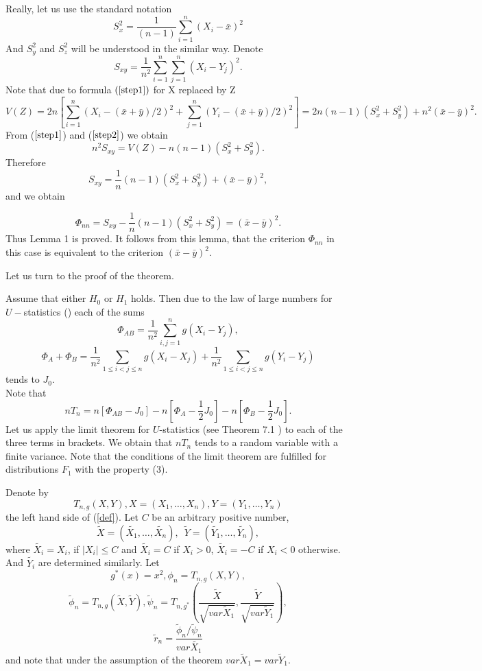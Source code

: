 \documentclass[final,11pt,3p]{elsarticle}
\begin{document}
Really, let us use the standard notation
$$
S_x^2=\frac {1}{(n-1)} \sum_{i=1}^n (X_i - \bar x)^2
$$
And  $S_y^2$ and $S_z^2$ will be understood in the similar way.
Denote 
$$
S_{xy}=\frac{1}{n^2}\sum_{i=1}^n\sum_{j=1}^n (X_i-Y_j)^2.
$$
Note that due to formula $(\ref{step1})$ for X replaced by Z
\begin{equation}\label{step3a}
V(Z)=2n[\sum_{i=1}^n(X_i- (\bar x + \bar y)/2)^2 +\sum_{j=1}^n(Y_i- (\bar x + \bar y)/2)^2] = 2n(n-1) (S_x^2 + S_y^2) +n^2(\bar x- \bar y)^2.
\end{equation}
From ($\ref{step1}$) and  ($\ref{step2}$) we obtain
\begin{equation}\label{step3}
n^2S_{xy}=V(Z)-n(n-1)(S_x^2+S_y^2).
\end{equation}
Therefore
$$
S_{xy} =\frac{1}{n}(n-1)(S_x^2+S_y^2)+ (\bar x-\bar y)^2,
$$
and we obtain

$$
\Phi_{nn}= S_{xy} - \frac{1}{n}(n-1)(S_x^2+S_y^2)=(\bar x - \bar y)^2.  
$$
Thus Lemma 1 is proved.
It follows from this lemma, that the criterion $\Phi_{nn}$ in this case is equivalent to the criterion $(\bar x - \bar y)^2.$

Let us turn to the proof of the theorem.

Assume that either $H_0$ or $H_1$ holds. Then due to the law of large numbers for $U-$statistics (\cite{Hoeffding}) each of the sums 
$$
\Phi_{AB}=\frac{1}{n^2}\sum_{i,j=1}^n g(X_i - Y_j),
$$
$$
\Phi_{A}+ \Phi_{B}=\frac{1}{n^2}\sum_{1\leq i<j\leq n}  g(X_i - X_j)+
\frac{1}{n^2}\sum_{1\leq i<j\leq n}  g(Y_i - Y_j)
$$
tends to $J_0$. \\
Note that
$$
nT_n=n[\Phi_{AB}-J_0] -n[\Phi_{A}-\frac{1}{2}J_0]-n[\Phi_{B}- \frac{1}{2}J_0].
$$
Let us apply the limit theorem for $U$-statistics (see Theorem 7.1 \cite{Hoeffding}) to each of the three terms in brackets. We obtain that $nT_n$ tends to a random variable with a finite variance. Note that the conditions of the limit theorem are fulfilled for distributions $F_1$ with the property (3). 

Denote by
$$
T_{n,g}(X,Y), X=(X_1,\dots,X_n), Y=(Y_1,\dots, Y_n) 
$$
the left hand side of (\ref{def}).
Let  $C$ be an arbitrary positive number,
$$
\tilde{X}=(\tilde{X_{1}},\ldots,\tilde{X_{n}}),\,\,\,
\tilde{Y}=(\tilde{Y_{1}},\ldots, \tilde{Y_{n}}),
$$
where $\tilde{X_{i}}=X_{i}$, if $
|X_{i}| \leq C$ and
 $\tilde{X_i}=C$ if $X_{i}>0$,
  $\tilde{X_i}=-C$ if $X_{i}<0$ otherwise. And $\tilde{Y_{i}}$ are determined similarly. 
Let 
$$
g^*(x)=x^2, \phi_n =T_{n,g}(X,Y),
$$
$$ 
\tilde \phi_n =T_{n,g}(\tilde X,\tilde Y),\tilde \psi_n =T_{n,g^*}(\frac {\tilde X}{\sqrt{var \tilde X_1}} ,\frac {\tilde Y}{\sqrt{var \tilde Y_1}}),
$$
$$
\tilde r_n=\frac {\tilde \phi_n/\tilde \psi_n}{var \tilde{ X_1}}  
$$
and note that under the assumption of the theorem $var \tilde X_1 =var \tilde Y_1$.
\end{document}
